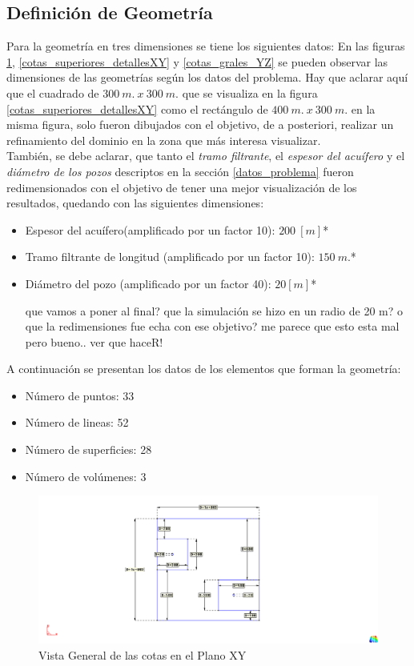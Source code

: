 \documentclass[10pt,a4paper,final]{article}
\begin{document}
\subsection{Definición de Geometría}
Para la geometría en tres dimensiones se tiene los siguientes datos:
En las figuras \ref{cotas_superiores_generalesXY}, \ref{cotas_superiores_detallesXY} y \ref{cotas_grales_YZ} se pueden observar
las dimensiones de las geometrías según los datos del problema. Hay que aclarar aquí que el cuadrado de $300~m.~x~300~m.$ que se visualiza
en la figura \ref{cotas_superiores_detallesXY} como el rectángulo de $400~m.~x~300~m.$ en la misma figura, solo fueron dibujados con el
objetivo, de a posteriori, realizar un refinamiento del dominio en la zona que más interesa visualizar.\\
También, se debe aclarar, que tanto el \emph{tramo filtrante}, el \emph{espesor del acuífero} y el \emph{diámetro de los pozos} descriptos en la sección \ref{datos_problema} fueron redimensionados con el objetivo de tener una  mejor visualización de los resultados, quedando con las siguientes dimensiones:
\begin{itemize}
		\item Espesor del acuífero(amplificado por un factor 10): $200 ~\left[m\right]$*
		\item Tramo filtrante de longitud (amplificado por un factor 10): $150~m.$*
		\item Diámetro del pozo (amplificado por un factor 40): $20 [m]$*
		\begin{Large}
		que vamos a poner al final? que la simulación se hizo en un radio de 20 m? o que la redimensiones fue echa con ese objetivo? me parece que esto esta mal pero bueno.. ver que haceR!
		\end{Large}
\end{itemize}
A continuación se presentan los datos de los elementos que forman la geometría:
\begin{itemize}
\item Número de puntos: 33
\item Número de lineas: 52
\item Número de superficies: 28
\item Número de volúmenes: 3
\end{itemize}

\begin{figure}[tbhp]
\centerline{\includegraphics[scale=0.75]{img/cotas_superiores_generalesXY}}
\caption{Vista General de las cotas en el Plano XY}
\label{cotas_superiores_generalesXY}
\end{figure}
\end{document}

